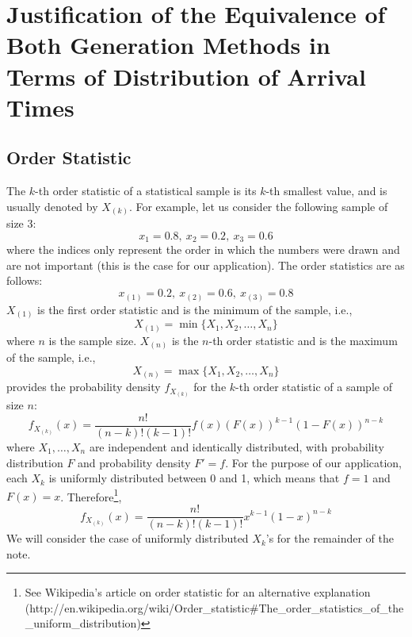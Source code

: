 \documentclass[12pt]{article} %
\begin{document}
\section{Justification of the Equivalence of Both Generation Methods in Terms of Distribution of Arrival Times}\label{sec:justification}
%
%
%
\subsection{Order Statistic}
%
The $k$-th order statistic of a statistical sample is its $k$-th
smallest value, and is usually denoted by $X_{(k)}$. For example, let
us consider the following sample of size 3:
\[
x_1=0.8,\ x_2=0.2,\ x_3=0.6
\]
where the indices only represent the order in which the numbers were
drawn and are not important (this is the case for our
application). The order statistics are as follows:
\[
x_{(1)}=0.2,\ x_{(2)}=0.6,\ x_{(3)}=0.8
\]
$X_{(1)}$ is the first order statistic and is the minimum of the sample, i.e.,
\[
X_{(1)}=\min\{X_1,X_2,\ldots,X_n\}
\]
where $n$ is the sample size. $X_{(n)}$ is the $n$-th order statistic
and is the maximum of the sample, i.e.,
\[
X_{(n)}=\max\{X_1,X_2,\ldots,X_n\}
\]
\citet{00ross} provides the probability density $f_{X_{(k)}}$ for the
$k$-th order statistic of a sample of size $n$:
\begin{equation}
  f_{X_{(k)}}(x) = \frac{n!}{(n-k)!(k-1)!}f(x)\left(F(x)\right)^{k-1}\left(1-F(x)\right)^{n-k}
\end{equation}
where $X_1,\ldots,X_n$ are independent and identically distributed,
with probability distribution $F$ and probability density $F'=f$. For
the purpose of our application, each $X_k$ is uniformly distributed
between 0 and 1, which means that $f=1$ and $F(x)=x$. Therefore\footnote{See Wikipedia's article on order statistic for an alternative explanation (http://en.wikipedia.org/wiki/Order\_statistic\#The\_order\_statistics\_of\_the\_uniform\_distribution)},
\begin{equation}\label{eq:densityOrder}
f_{X_{(k)}}(x) = \frac{n!}{(n-k)!(k-1)!}x^{k-1}(1-x)^{n-k}
\end{equation}
We will consider the case of uniformly distributed $X_k$'s for the
remainder of the note.
%
%
\end{document}
